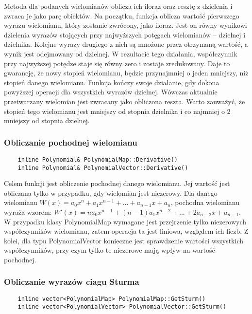 \documentclass[oneside,a4paper]{book}
\begin{document}
	Metoda dla podanych wielomianów oblicza ich iloraz oraz resztę z dzielenia i zwraca je jako parę obiektów. Na początku, funkcja oblicza wartość pierwszego wyrazu wielomianu, który zostanie zwrócony, jako iloraz. Jest on równy wynikowi dzielenia wyrazów stojących przy najwyższych potęgach wielomianów – dzielnej i dzielnika. Kolejne wyrazy drugiego z nich są mnożone przez otrzymaną wartość, a wynik jest odejmowany od dzielnej. W rezultacie tego działania, współczynnik przy najwyższej potędze staje się równy zero i zostaje zredukowany. Daje to gwarancję, że nowy stopień wielomianu, będzie przynajmniej o jeden mniejszy, niż stopień danego wielomianu. Funkcja kończy swoje działanie, gdy dokona powyższej operacji dla wszystkich wyrazów dzielnej. Wówczas aktualnie przetwarzany wielomian jest zwracany jako obliczona reszta. Warto zauważyć, że stopień tego wielomianu jest mniejszy od stopnia dzielnika i co najmniej o 2 mniejszy od stopnia dzielnej.
	
	\subsubsection{Obliczanie pochodnej wielomianu}
	\begin{lstlisting}
	inline Polynomial& PolynomialMap::Derivative()
	inline Polynomial& PolynomialVector::Derivative()
	\end{lstlisting}
	
	Celem funkcji jest obliczenie pochodnej danego wielomianu. Jej wartość jest obliczana tylko w przypadku, gdy wielomian jest niezerowy. Dla danego wielomianu $W(x) = a_0x^n + a_1x^{n-1} + ... + a_{n-1}x + a_n$, pochodna wielomianu wyraża wzorem: $W'(x) = na_0x^{n-1} + (n-1)a_1x^{n-2} + ... + 2a_{n-2}x + a_{n-1}$. W przypadku klasy PolynomialMap wymagane jest przejrzenie tylko niezerowych współczynników wielomianu, zatem operacja ta jest liniowa, względem ich liczb. Z kolei, dla typu PolynomialVector konieczne jest sprawdzenie wartości wszystkich współczynników, przy czym tylko te niezerowe mają wpływ na wartość pochodnej.
	
	\subsubsection{Obliczanie wyrazów ciagu Sturma}
	\begin{lstlisting}
	inline vector<PolynomialMap> PolynomialMap::GetSturm()
	inline vector<PolynomialVector> PolynomialVector::GetSturm()
	\end{lstlisting}
	
\end{document}
